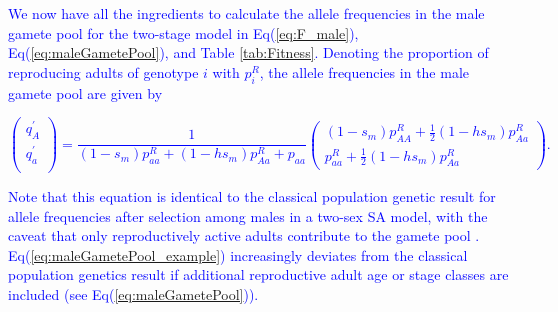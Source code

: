 \documentclass[11pt]{article}
\begin{document}
\textcolor{blue}{ We now have all the ingredients to calculate the allele frequencies in the male gamete pool for the two-stage model in Eq(\ref{eq:F_male}), Eq(\ref{eq:maleGametePool}), and Table \ref{tab:Fitness}. Denoting the proportion of reproducing adults of genotype $i$ with $p^R_i$, the allele frequencies in the male gamete pool are given by 
\begin{linenomath*}
\begin{equation} \label{eq:maleGametePool_example}
\left(
		\begin{array}{c}
			q^{\prime}_{A} \\
			q^{\prime}_{a} \\
		\end{array} \right) = 
				\frac{1}{(1-s_m)p^R_{aa}+ (1-hs_m)p^R_{Aa}+p_{aa}}\left(
		\begin{array}{c}
(1-s_m)p^R_{AA}	+\frac{1}{2}(1-hs_m)p^R_{Aa}\\
p^R_{aa}+\frac{1}{2}(1-hs_m)p^R_{Aa}
		\end{array} \right).
\end{equation}
\end{linenomath*}
Note that this equation is identical to the classical population genetic result for allele frequencies after selection among males in a two-sex SA model, with the caveat that only reproductively active adults contribute to the gamete pool \citep[e.g., see Eq(1a) of][]{Kidwell1977}. Eq(\ref{eq:maleGametePool_example}) increasingly deviates from the classical population genetics result if additional reproductive adult age or stage classes are included (see Eq(\ref{eq:maleGametePool})).  }
\end{document}
